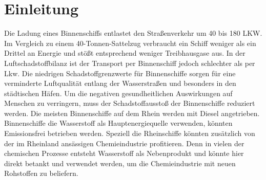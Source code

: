 \chapter{Einleitung}\label{ch:Einleitung}
Die Ladung eines Binnenschiffs entlastet den Straßenverkehr um 40 bis 180 LKW. 
Im Vergleich zu einem 40-Tonnen-Sattelzug verbraucht ein Schiff weniger 
als ein Drittel an Energie und stößt entsprechend weniger Treibhausgase aus. 
In der Luftschadstoffbilanz ist der Transport per Binnenschiff jedoch 
schlechter als per Lkw.\cite{UmweltBundesamt.2020}
Die niedrigen Schadstoffgrenzwerte für Binnenschiffe sorgen für eine 
verminderte Luftqualität entlang der Wasserstraßen und besonders in den 
städtischen Häfen. 
Um die negativen gesundheitlichen Auswirkungen auf Menschen zu verringern, muss der Schadstoffausstoß der Binnenschiffe reduziert werden.
Die meisten Binnenschiffe auf dem Rhein werden mit Diesel angetrieben. 
Binnenschiffe die Wasserstoff als Hauptenergiequelle verwenden, könnten Emissionsfrei betrieben werden. Speziell die Rheinschiffe könnten zusätzlich von der im Rheinland ansässigen Chemieindustrie profitieren. Denn in 
vielen der chemischen Prozesse entsteht Wasserstoff als Nebenprodukt und könnte 
hier direkt betankt und verwendet werden, um die Chemieindustrie mit neuen 
Rohstoffen zu beliefern.
